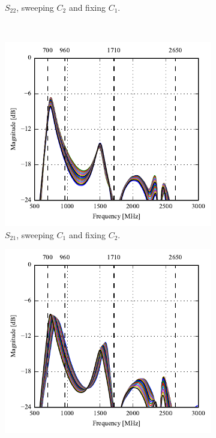\begin{figure}[htbp]
\begin{subfigure}[b]{0.49\linewidth}
        \caption{$S_{22}$, sweeping $C_2$ and fixing $C_1$.}
        \label{fig:ant1_proto_sim_s22}
    \end{subfigure}
~
    \begin{subfigure}[b]{0.49\linewidth}
        \centering
        \includegraphics{img/tech_sol/monopole/prototype_v1/s12_s11}
        \caption{$S_{21}$, sweeping $C_1$ and fixing $C_2$.}
        \label{fig:ant1_proto_sim_s11}
    \end{subfigure}
    \hfill
    \begin{subfigure}[b]{0.49\linewidth}
        \centering
        \includegraphics{img/tech_sol/monopole/prototype_v1/s12_s22}

\end{subfigure}
\end{figure}
